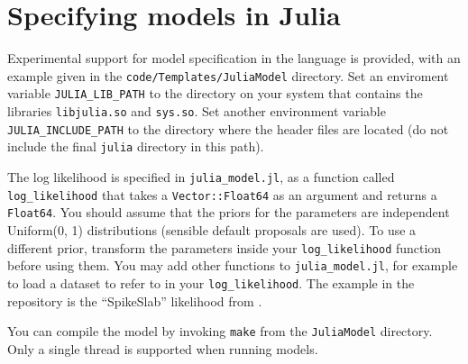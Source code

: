 \documentclass[article, nojss]{jss}
\begin{document}


\section{Specifying models in Julia}
Experimental support for model specification in the
 language \citep{julia}
is provided, with an example given in the
{\tt code/Templates/JuliaModel} directory.
Set an enviroment variable {\tt JULIA\_LIB\_PATH} to the directory on your
system that contains the libraries {\tt libjulia.so} and
{\tt sys.so}. Set another environment variable {\tt JULIA\_INCLUDE\_PATH}
to the directory where the  header files are located
(do not include the final {\tt julia} directory in this path).

The log likelihood is specified in {\tt julia\_model.jl}, as a function
called {\tt log\_likelihood} that takes a {\tt Vector::Float64} as an argument
and returns a {\tt Float64}. You should assume that the priors for the
parameters are independent Uniform(0, 1) distributions (sensible default
proposals are used). To use a different prior, transform the parameters inside
your {\tt log\_likelihood} function before using them.
You may add other functions to {\tt julia\_model.jl}, for example to load
a dataset to refer to in your {\tt log\_likelihood}. The example in
the repository is the ``SpikeSlab'' likelihood from
\citet{brewer2011diffusive}.

You can compile the model by invoking {\tt make}
from the {\tt JuliaModel} directory.
Only a single thread is supported when running 
models.
\end{document}
